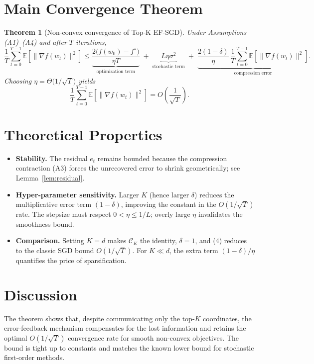 \documentclass{article}
\newtheorem{theorem}{Theorem}
\newcommand{\E}{\mathbb{E}}
\begin{document}
\section*{Main Convergence Theorem}
\begin{theorem}[Non‑convex convergence of Top‑K EF‑SGD]\label{thm:main}
Under Assumptions (A1)–(A4) and after $T$ iterations,
\[
\frac{1}{T}\sum_{t=0}^{T-1}\E\!\left[\|\nabla f(w_{t})\|^{2}\right]
\le
\underbrace{\frac{2\bigl(f(w_{0})-f^{\star}\bigr)}{\eta T}}_{\text{optimization term}}
\;+\;
\underbrace{L\eta\sigma^{2}}_{\text{stochastic term}}
\;+\;
\underbrace{\frac{2(1-\delta)}{\eta}\,\frac{1}{T}\sum_{t=0}^{T-1}\E\!\left[\| \nabla f(w_{t})\|^{2}\right]}_{\text{compression error}}.
\tag{4}
\]
Choosing $\eta=\Theta\!\bigl(1/\sqrt{T}\bigr)$ yields
\[
\frac{1}{T}\sum_{t=0}^{T-1}\E\!\left[\|\nabla f(w_{t})\|^{2}\right]=O\!\left(\frac{1}{\sqrt{T}}\right).
\]
\end{theorem}

\section*{Theoretical Properties}
\begin{itemize}
\item \textbf{Stability.} The residual $e_{t}$ remains bounded because the compression contraction (A3) forces the unrecovered error to shrink geometrically; see Lemma~\ref{lem:residual}.
\item \textbf{Hyper‑parameter sensitivity.} Larger $K$ (hence larger $\delta$) reduces the multiplicative error term $(1-\delta)$, improving the constant in the $O(1/\sqrt{T})$ rate. The stepsize must respect $0<\eta\le1/L$; overly large $\eta$ invalidates the smoothness bound.
\item \textbf{Comparison.} Setting $K=d$ makes $\mathcal C_{K}$ the identity, $\delta=1$, and (4) reduces to the classic SGD bound $O(1/\sqrt{T})$. For $K\ll d$, the extra term $(1-\delta)/\eta$ quantifies the price of sparsification.
\end{itemize}

\section*{Discussion}
The theorem shows that, despite communicating only the top‑$K$ coordinates, the error‑feedback mechanism compensates for the lost information and retains the optimal $O(1/\sqrt{T})$ convergence rate for smooth non‑convex objectives. The bound is tight up to constants and matches the known lower bound for stochastic first‑order methods.
\end{document}
